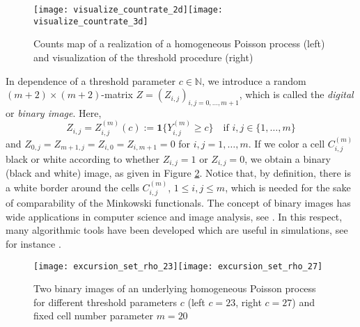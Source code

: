 \documentclass[12pt]{article}
\def\N{\mathbb{N}}
\begin{document}
\begin{figure}[t]
\centering
\texttt{[image: visualize\_countrate\_2d]}\hspace{0.5cm}\texttt{[image: visualize\_countrate\_3d]}
\caption{Counts map of a realization of a homogeneous Poisson process (left) and visualization of the threshold procedure (right)\label{fig:cm.img}}
\end{figure}
In dependence of a threshold parameter $c\in\N$, we introduce a random $(m+2)\times (m+2)$-matrix $Z=(Z_{i,j})_{i,j=0,\ldots,m+1}$, which is called the {\em digital} or {\em binary image}. Here,
\begin{equation*}
Z_{i,j}=Z_{i,j}^{(m)}(c):=\mathbf{1}\{Y_{i,j}^{(m)}\ge c\}\quad\mbox{if } i,j\in\{1,\ldots,m\}
\end{equation*}
and $Z_{0,j}=Z_{m+1,j}=Z_{i,0}=Z_{i,m+1}=0$ for $i,j=1,\ldots,m$. If we color a cell $C_{i,j}^{(m)}$ black or white according to whether $Z_{i,j}=1$ or $Z_{i,j}=0$,
we obtain a binary (black and white) image, as given in Figure \ref{fig:bin.img}. Notice that, by definition, there is a white border around the cells $C_{i,j}^{(m)}$, $1\le i,j\le m$,
 which is needed for the sake of comparability of the Minkowski functionals. The concept of binary images has wide applications in computer science and image analysis, see \cite{39,38}. In this respect, many algorithmic tools have been developed which are useful in simulations, see for instance \cite{13}.
\begin{figure}[t]
\centering

\texttt{[image: excursion\_set\_rho\_23]}\hspace{1cm}\texttt{[image: excursion\_set\_rho\_27]}
\caption{Two binary images of an underlying homogeneous Poisson process for different threshold parameters $c$ (left $c=23$, right $c=27$) and fixed cell number parameter $m=20$\label{fig:bin.img}}
\end{figure}






\end{document}
